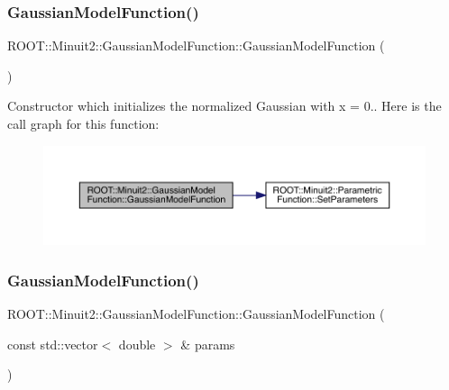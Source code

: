 \subsubsection{\texorpdfstring{GaussianModelFunction()}{GaussianModelFunction()}\hspace{0.1cm}{\footnotesize\ttfamily [1/4]}}
{\footnotesize\ttfamily R\+O\+O\+T\+::\+Minuit2\+::\+Gaussian\+Model\+Function\+::\+Gaussian\+Model\+Function (\begin{DoxyParamCaption}{ }\end{DoxyParamCaption})\hspace{0.3cm}{\ttfamily [inline]}}

Constructor which initializes the normalized Gaussian with x = 0.. Here is the call graph for this function\+:\nopagebreak
\begin{figure}[H]
\begin{center}
\leavevmode
\includegraphics[width=350pt]{d4/df6/classROOT_1_1Minuit2_1_1GaussianModelFunction_aebecd6f3f9e7b6e7d6787f38cfc84cdc_cgraph}
\end{center}
\end{figure}
\mbox{\label{classROOT_1_1Minuit2_1_1GaussianModelFunction_ab766a76f32f2369508bde703519cc049}} 
\subsubsection{\texorpdfstring{GaussianModelFunction()}{GaussianModelFunction()}\hspace{0.1cm}{\footnotesize\ttfamily [2/4]}}
{\footnotesize\ttfamily R\+O\+O\+T\+::\+Minuit2\+::\+Gaussian\+Model\+Function\+::\+Gaussian\+Model\+Function (\begin{DoxyParamCaption}\item[{const std\+::vector$<$ double $>$ \&}]{params }\end{DoxyParamCaption})\hspace{0.3cm}{\ttfamily [inline]}}

